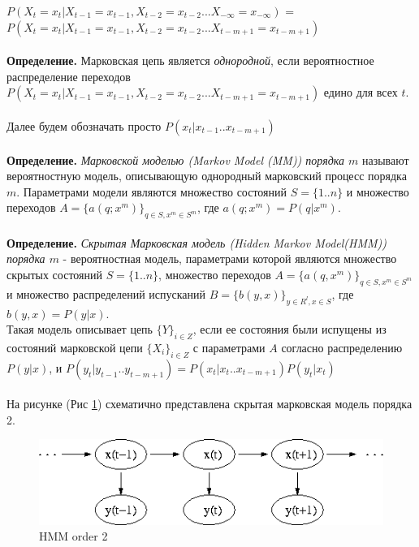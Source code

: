 \documentclass[10pt,a4paper]{article}
\begin{document}
$ P(X_{t} = x_{t}|X_{t-1}=x_{t-1},X_{t-2}=x_{t-2} ... X_{-\infty}=x_{-\infty})$ = 
$ P(X_{t} = x_{t}|X_{t-1}=x_{t-1},X_{t-2}=x_{t-2} ... X_{t-m+1}=x_{t-m+1}) $ 
\\\\
\textbf{Определение.} Марковская цепь является \textit{однородной}, если вероятностное распределение переходов $P(X_{t} = x_{t}|X_{t-1}=x_{t-1},X_{t-2}=x_{t-2} ... X_{t-m+1}=x_{t-m+1})$ едино для всех $ t $.
\\\\
Далее будем обозначать просто $ P(x_{t}|x_{t-1}..x_{t-m+1})$
\\\\
\textbf{Определение.} \emph{Марковской моделью (Markov Model (MM)) порядка $ m $} называют вероятностную модель, описывающую однородный марковский процесс порядка $ m $.
Параметрами модели являются множество состояний $ S = \{1..n\} $ и множество переходов $ A = \{a(q; x^{m})\}_{q \in S, x^{m} \in S^{m}}$, где $a(q; x^{m}) = P(q|x^{m})$. 
\\\\
\textbf{Определение.} \emph{Скрытая Марковская модель (Hidden Markov Model(HMM)) порядка $ m $} - вероятностная модель, параметрами которой являются множество скрытых состояний $ S = \{1..n\} $, множество переходов $ A = \{a(q, x^{m})\}_{q \in S, x^{m} \in S^{m}}$ и множество распределений испусканий $ B = \{b(y,x)\}_{y \in R^{l}, x \in S}$, где $ b(y, x) = P(y|x)$. 
\\
Такая модель описывает цепь $\{Y\}_{i \in Z}$, если ее состояния были испущены из состояний марковской цепи $\{X_{i}\}_{i \in Z}$ с параметрами $ A $ согласно распределению $ P(y|x) $, и $ P(y_{t}|y_{t-1}..y_{t-m+1}) = P(x_{t}|x_{t}..x_{t-m+1})P(y_t|x_t)$  
\\\\
На рисунке (Рис \ref{ris:image}) схематично представлена скрытая марковская модель порядка 2.
\\
\begin{figure}[hbtp]
\includegraphics[scale=0.4]{img/Hmm_temporal_bayesian_net.png}
\centering
\caption{HMM order 2}
\label{ris:image}
\end{figure}
\\\\
\end{document}
